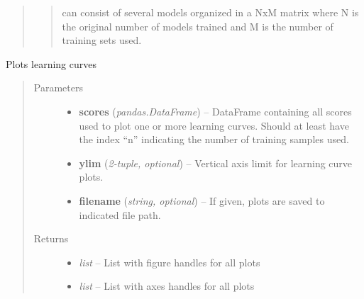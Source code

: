 \documentclass[letterpaper,10pt,english]{sphinxmanual}
\begin{document}
\begin{fulllineitems}
\begin{quote}
\begin{description}
\begin{itemize}
\begin{quote}
can consist of several models organized in a NxM matrix where
N is the original number of models trained and M is the number
of training sets used.
\end{quote}

\end{itemize}


\end{description}\end{quote}

\end{fulllineitems}


\begin{fulllineitems}
\label{classification:flamingo.classification.test.plot_learning_curve}
Plots learning curves
\begin{quote}\begin{description}
\item[{Parameters}] \leavevmode\begin{itemize}
\item {} 
\textbf{scores} (\emph{pandas.DataFrame}) -- DataFrame containing all scores used to plot one or more learning curves.
Should at least have the index ``n'' indicating the number of training samples
used.

\item {} 
\textbf{ylim} (\emph{2-tuple, optional}) -- Vertical axis limit for learning curve plots.

\item {} 
\textbf{filename} (\emph{string, optional}) -- If given, plots are saved to indicated file path.

\end{itemize}

\item[{Returns}] \leavevmode
\begin{itemize}
\item {} 
\emph{list} --
List with figure handles for all plots

\item {} 
\emph{list} --
List with axes handles for all plots

\end{itemize}


\end{description}\end{quote}

\end{fulllineitems}
\end{document}
